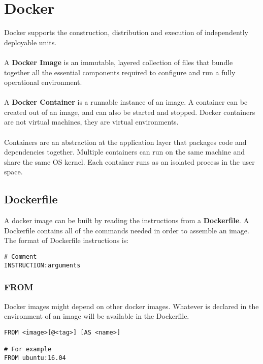 \documentclass{article}
\begin{document}
\section{Docker}
Docker supports the construction, distribution and execution of independently deployable units. \\ \\
A \textbf{Docker Image} is an immutable, layered collection of files that bundle together all the essential components required to configure and run a fully operational environment. \\ \\
A \textbf{Docker Container} is a runnable instance of an image. A container can be created out of an image, and can also be started and stopped. Docker containers are not virtual machines, they are virtual environments. \\ \\
Containers are an abstraction at the application layer that packages code and dependencies together. Multiple containers can run on the same machine and share the same OS kernel. Each container runs as an isolated process in the user space.

\subsection{Dockerfile}
A docker image can be built by reading the instructions from a \textbf{Dockerfile}. A Dockerfile contains all of the commands needed in order to assemble an image. The format of Dockerfile instructions is: \\

\begin{lstlisting}[language=docker,breaklines=true,label={code:compose}]
# Comment
INSTRUCTION:arguments
\end{lstlisting}

\subsubsection{FROM}
Docker images might depend on other docker images. Whatever is declared in the environment of an image will be available in the Dockerfile. \\

\begin{lstlisting}[language=docker,breaklines=true,label={code:compose}]
FROM <image>[@<tag>] [AS <name>]

# For example
FROM ubuntu:16.04
\end{lstlisting}
\end{document}
